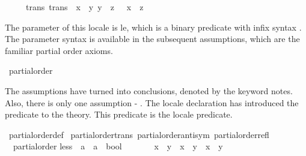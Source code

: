 \begin{isabellebody}
\ \ \ \ \ trans\ {\isacharbrackleft}{\kern0pt}trans{\isacharbrackright}{\kern0pt}{\isacharcolon}{\kern0pt}\ {\isachardoublequoteopen}{\isasymlbrakk}\ x\ {\isasymsqsubseteq}\ y{\isacharsemicolon}{\kern0pt}\ y\ {\isasymsqsubseteq}\ z\ {\isasymrbrakk}\ {\isasymLongrightarrow}\ x\ {\isasymsqsubseteq}\ z{\isachardoublequoteclose}%
\begin{isamarkuptext}%
The parameter of this locale is le, which is a binary predicate with infix syntax \isa{{\isasymsqsubseteq}}. 
The parameter syntax is available in the subsequent assumptions,
which are the familiar partial order axioms.%
\end{isamarkuptext}\isamarkuptrue%
\isamarkupfalse%
\isanewline
\isanewline
{}\isamarkupfalse%
{\isacharbang}{\kern0pt}\ partial{\isacharunderscore}{\kern0pt}order%
\begin{isamarkuptext}%
The assumptions have turned into conclusions, denoted by the keyword notes. 
Also, there is only one assumption - . 
The locale declaration has introduced the predicate  to the theory. 
This predicate is the locale predicate.%
\end{isamarkuptext}\isamarkuptrue%
\isamarkupfalse%
\ partial{\isacharunderscore}{\kern0pt}order{\isacharunderscore}{\kern0pt}def\isanewline
{}\isamarkupfalse%
\ partial{\isacharunderscore}{\kern0pt}order{\isachardot}{\kern0pt}trans\ partial{\isacharunderscore}{\kern0pt}order{\isachardot}{\kern0pt}anti{\isacharunderscore}{\kern0pt}sym\ partial{\isacharunderscore}{\kern0pt}order{\isachardot}{\kern0pt}refl%
\isadelimdocument
%
\endisadelimdocument
%
\isatagdocument
%
\isamarkuptrue%
%
\endisatagdocument
{\isafolddocument}%
%
\isadelimdocument
%
\endisadelimdocument
{}\isamarkupfalse%
\ {\isacharparenleft}{\kern0pt}\ partial{\isacharunderscore}{\kern0pt}order{\isacharparenright}{\kern0pt}\isanewline
less\ {\isacharcolon}{\kern0pt}{\isacharcolon}{\kern0pt}\ {\isachardoublequoteopen}{\isacharprime}{\kern0pt}a\ {\isasymRightarrow}\ {\isacharprime}{\kern0pt}a\ {\isasymRightarrow}\ bool{\isachardoublequoteclose}\ {\isacharparenleft}{\kern0pt}\ {\isachardoublequoteopen}{\isasymsqsubset}{\isachardoublequoteclose}\ {}{}{\isacharparenright}{\kern0pt}\ \isanewline
\ \ \ {\isachardoublequoteopen}{\isacharparenleft}{\kern0pt}x\ {\isasymsqsubset}\ y{\isacharparenright}{\kern0pt}\ {\isacharequal}{\kern0pt}\ {\isacharparenleft}{\kern0pt}x\ {\isasymsqsubseteq}\ y\ {\isasymand}\ x\ {\isasymnoteq}\ y{\isacharparenright}{\kern0pt}{\isachardoublequoteclose}%

\end{isabellebody}
